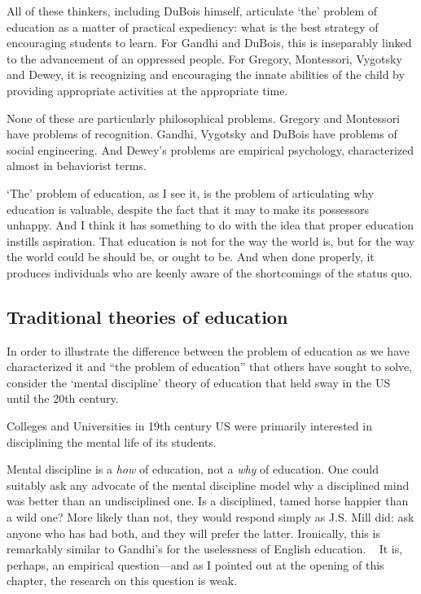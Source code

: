 All of these thinkers, including DuBois himself, articulate `the' problem of education as a matter of practical expediency: what is the best strategy of encouraging students to learn. For Gandhi and DuBois, this is inseparably linked to the advancement of an oppressed people. For Gregory, Montessori, Vygotsky and Dewey, it is recognizing and encouraging the innate abilities of the child by providing appropriate activities at the appropriate time. 

None of these are particularly philosophical problems. Gregory and Montessori have problems of recognition. Gandhi, Vygotsky and DuBois have problems of social engineering. And Dewey's problems are empirical psychology, characterized almost in behaviorist terms.

`The' problem of education, as I see it, is the problem of articulating why education is valuable, despite the fact that it may to make its possessors unhappy. And I think it has something to do with the idea that proper education instills aspiration. That education is not for the way the world is, but for the way the world could be should be, or ought to be. And when done properly, it produces individuals who are keenly aware of the shortcomings of the status quo. 

\subsection{Traditional theories of education}
\label{traditionaltheoriesofeducation}

In order to illustrate the difference between the problem of education as we have characterized it and ``the problem of education'' that others have sought to solve, consider the `mental discipline' theory of education that held sway in the US until the 20th century. 

Colleges and Universities in 19th century US were primarily interested in disciplining the mental life of its students.

Mental discipline is a \emph{how} of education, not a \emph{why} of education. One could suitably ask any advocate of the mental discipline model why a disciplined mind was better than an undisciplined one. Is a disciplined, tamed horse happier than a wild one? More likely than not, they would respond simply as J.S. Mill did: ask anyone who has had both, and they will prefer the latter. Ironically, this is remarkably similar to Gandhi's for the uselessness of English education. ~\citep[p. 99--100]{Gandhi:tSEwPMOB} It is, perhaps, an empirical question---and as I pointed out at the opening of this chapter, the research on this question is weak.

